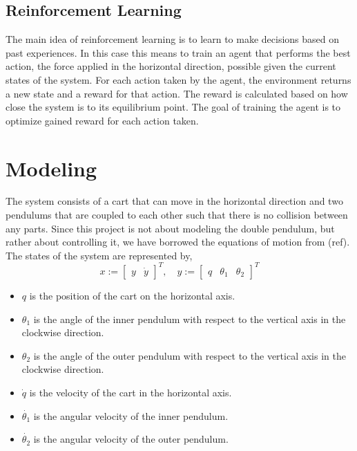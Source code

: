 \documentclass{LTHtwocol} %
\begin{document}
\subsection{Reinforcement Learning}
The main idea of reinforcement learning is to learn to make decisions based on past experiences.
In this case this means to train an agent that performs the best action, the force applied in the horizontal direction,  possible given the current states of the system.
For each action taken by the agent, the environment returns a new state and a reward for that action.
The reward is calculated based on how close the system is to its equilibrium point.
The goal of training the agent is to optimize gained reward for each action taken.

\section{Modeling}
The system consists of a cart that can move in the horizontal direction and two pendulums that are coupled to each other such that there is no collision between any parts.
Since this project is not about modeling the double pendulum, but rather about controlling it, we have borrowed the equations of motion from (ref).
The states of the system are represented by,
\begin{equation}
x  :=
\begin{bmatrix}
y & \dot{y}
\end{bmatrix}
^T , \quad y :=
\begin{bmatrix}
q & \theta_1 & \theta_2
\end{bmatrix}
^T
\end{equation}
\begin{itemize}
\item $q$ is the position of the cart on the horizontal axis.
\item $\theta_1$ is the angle of the inner pendulum with respect to the vertical axis in the clockwise direction.
\item $\theta_2$ is the angle of the outer pendulum with respect to the vertical axis in the clockwise direction.
\item $\dot{q}$ is the velocity of the cart in the horizontal axis.
\item $\dot{\theta_1}$ is the angular velocity of the inner pendulum.
\item $\dot{\theta_2}$ is the angular velocity of the outer pendulum.
\end{itemize}
\end{document}
